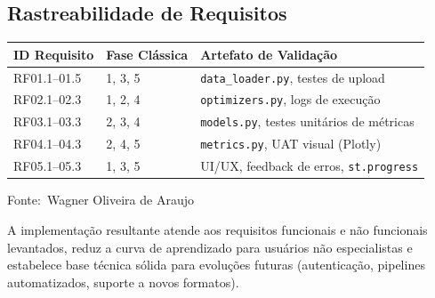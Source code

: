 \documentclass[12pt,a4paper]{article}
\newcommand{\oautor}{Wagner Oliveira de Araujo}
\begin{document}
\subsection{Rastreabilidade de Requisitos}

\begin{quadro}[ht]
\begin{center}
\small
\caption{Matriz de rastreabilidade de requisitos (RTM)}
\label{quadro:rtm}
\begin{threeparttable}
\begin{tabularx}{\textwidth}{|l|l|X|} \hline
\textbf{ID Requisito} & \textbf{Fase Clássica} & \textbf{Artefato de Validação} \\ \hline
RF01.1--01.5 & 1, 3, 5 & \texttt{data\_loader.py}, testes de upload \\ \hline
RF02.1--02.3 & 1, 2, 4 & \texttt{optimizers.py}, logs de execução \\ \hline
RF03.1--03.3 & 2, 3, 4 & \texttt{models.py}, testes unitários de métricas \\ \hline
RF04.1--04.3 & 2, 4, 5 & \texttt{metrics.py}, UAT visual (Plotly) \\ \hline
RF05.1--05.3 & 1, 3, 5 & UI/UX, feedback de erros, \texttt{st.progress} \\ \hline
\end{tabularx}
\begin{tablenotes}[flushleft]
\footnotesize
\item Fonte:~\oautor
\end{tablenotes}
\end{threeparttable}
\end{center}
\end{quadro}

A implementação resultante atende aos requisitos funcionais e não funcionais levantados, reduz a curva de aprendizado para usuários não especialistas e estabelece base técnica sólida para evoluções futuras (autenticação, pipelines automatizados, suporte a novos formatos).
\end{document}
